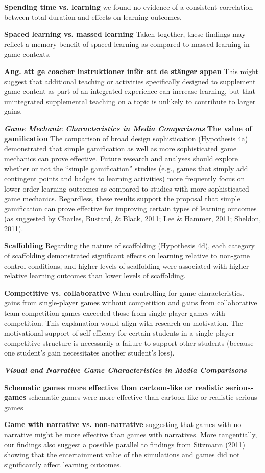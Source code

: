 \textbf{Spending time vs. learning}
we found no evidence of a consistent correlation between total duration and effects on learning outcomes.

\textbf{Spaced learning vs. massed learning}
Taken together, these findings may reflect a memory benefit of spaced learning as compared to massed learning in game contexts.

\textbf{Ang. att ge coacher instruktioner inför att de stänger appen}
This might suggest that additional teaching or activities specifically designed to supplement game content as part of an integrated experience can increase learning, but that unintegrated supplemental teaching on a topic is unlikely to contribute to larger gains.

\textbf{\textit{Game Mechanic Characteristics in Media Comparisons}}
\textbf{The value of gamification}
The comparison of broad design sophistication (Hypothesis 4a) demonstrated that simple gamification as well as more sophisticated game mechanics can prove effective. Future research and analyses should explore whether or not the “simple gamification” studies (e.g., games that simply add contingent points and badges to learning activities) more frequently focus on lower-order learning outcomes as compared to studies with more sophisticated game mechanics. Regardless, these results support the proposal that simple gamification can prove effective for improving certain types of learning outcomes (as suggested by Charles, Bustard, \& Black, 2011; Lee \& Hammer, 2011; Sheldon, 2011).

\textbf{Scaffolding}
Regarding the nature of scaffolding (Hypothesis 4d), each category of scaffolding demonstrated significant effects on learning relative to non-game control conditions, and higher levels of scaffolding were associated with higher relative learning outcomes than lower levels of scaffolding.

\textbf{Competitive vs. collaborative}
When controlling for game characteristics, gains from single-player games without competition and gains from collaborative team competition games exceeded those from single-player games with competition. This explanation would align with research on motivation. The motivational support of self-efficacy for certain students in a single-player competitive structure is necessarily a failure to support other students (because one student’s gain necessitates another student’s loss).

\textbf{\textit{Visual and Narrative Game Characteristics in Media Comparisons}}

\textbf{Schematic games more effective than cartoon-like or realistic serious-games}
schematic games were more effective than cartoon-like or realistic serious games

\textbf{Game with narrative vs. non-narrative}
suggesting that games with no narrative might be more effective than games with narratives. More tangentially, our findings also suggest a possible parallel to findings from Sitzmann (2011) showing that the entertainment value of the simulations and games did not significantly affect learning outcomes.
